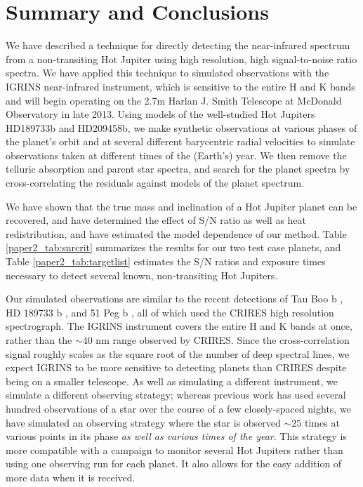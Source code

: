 \section{Summary and Conclusions}
\label{paper2_sec:summary}
We have described a technique for directly detecting the near-infrared spectrum from a 
non-transiting Hot Jupiter using high resolution, high signal-to-noise ratio spectra. We have applied this technique to simulated observations with the IGRINS near-infrared instrument, which is sensitive to the entire H and K bands and will begin operating on the 2.7m Harlan J. Smith Telescope at McDonald Observatory in late 2013. Using models of the well-studied Hot Jupiters HD189733b and HD209458b, we make synthetic observations at various phases of the planet's orbit and at several different barycentric radial velocities to simulate observations taken at different times of the (Earth's) year. We then remove the telluric absorption and parent star spectra, and search for the planet spectra by cross-correlating the residuals against models of the planet spectrum.

We have shown that the true mass and inclination of a Hot Jupiter planet can be recovered, and have determined the effect of S/N ratio as well as heat redistribution, and have estimated the model dependence of our method. Table \ref{paper2_tab:snrcrit} summarizes the results for our two test case planets, and Table \ref{paper2_tab:targetlist} estimates the S/N ratios and exposure times necessary to detect several known, non-transiting Hot Jupiters.

Our simulated observations are similar to the recent detections of Tau Boo b \citep{Rodler2012, Brogi2012}, HD 189733 b \citep{deKok2013}, and 51 Peg b \citep{Brogi2013}, all of which used the CRIRES high resolution spectrograph. The IGRINS instrument covers the entire H and K bands at once, rather than the $\sim 40$ nm range observed by CRIRES. Since the cross-correlation signal roughly scales as the square root of the number of deep spectral lines, we expect IGRINS to be more sensitive to detecting planets than CRIRES despite being on a smaller telescope. As well as simulating a different instrument, we simulate a different observing strategy; whereas previous work has used several hundred observations of a star over the course of a few closely-spaced nights, we have simulated an observing strategy where the star is observed $\sim 25$ times at various points in its phase \emph{as well as various times of the year}. This strategy is more compatible with a campaign to monitor several Hot Jupiters rather than using one observing run for each planet. It also allows for the easy addition of more data when it is received.

